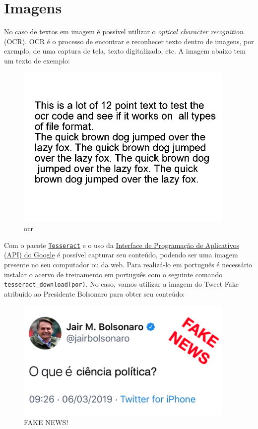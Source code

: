 \documentclass[]{book}
\begin{document}
\hypertarget{imagens}{%
\section{Imagens}\label{imagens}}

No caso de textos em imagem é possível utilizar o \emph{optical character recognition} (OCR). OCR
é o processo de encontrar e reconhecer texto dentro de imagens, por exemplo, de uma captura
de tela, texto digitalizado, etc. A imagem abaixo tem um texto de exemplo:

\begin{figure}
\centering
\includegraphics[width=4.16667in,height=\textheight]{images/testocr.png}
\caption{ocr}
\end{figure}

Com o pacote \href{https://cran.r-project.org/web/packages/tesseract/vignettes/intro.html}{\texttt{Tesseract}} e
o uso da \href{https://cloud.google.com/vision/}{Interface de Programação de Aplicativos (API) do Google} é
possível capturar seu conteúdo, podendo ser uma imagem presente no seu computador ou da
web. Para realizá-lo em português é necessário instalar o acervo de treinamento em português
com o seguinte comando \texttt{tesseract\_download(\textquotesingle{}por\textquotesingle{})}. No caso, vamos utilizar a imagem do Tweet Fake
atribuído ao Presidente Bolsonaro para obter seu conteúdo:

\begin{figure}
\centering
\includegraphics[width=4.16667in,height=\textheight]{images/tweet_bolsonaro_cp.png}
\caption{FAKE NEWS!}
\end{figure}
\end{document}
